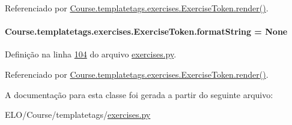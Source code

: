 Referenciado por \hyperlink{classCourse_1_1templatetags_1_1exercises_1_1ExerciseToken_af53c156486c9175af84cd003285aa95e}{Course.\+templatetags.\+exercises.\+Exercise\+Token.\+render()}.

\hypertarget{classCourse_1_1templatetags_1_1exercises_1_1ExerciseToken_ae15b200ce6e26966169799ea67b67bcd}{}
\paragraph[{format\+String}]{\setlength{\rightskip}{0pt plus 5cm}Course.\+templatetags.\+exercises.\+Exercise\+Token.\+format\+String = None\hspace{0.3cm}{\ttfamily [static]}}\label{classCourse_1_1templatetags_1_1exercises_1_1ExerciseToken_ae15b200ce6e26966169799ea67b67bcd}


Definição na linha \hyperlink{exercises_8py_source_l00104}{104} do arquivo \hyperlink{exercises_8py_source}{exercises.\+py}.



Referenciado por \hyperlink{classCourse_1_1templatetags_1_1exercises_1_1ExerciseToken_af53c156486c9175af84cd003285aa95e}{Course.\+templatetags.\+exercises.\+Exercise\+Token.\+render()}.



A documentação para esta classe foi gerada a partir do seguinte arquivo\+:\begin{DoxyCompactItemize}
\item 
E\+L\+O/\+Course/templatetags/\hyperlink{exercises_8py}{exercises.\+py}\end{DoxyCompactItemize}
